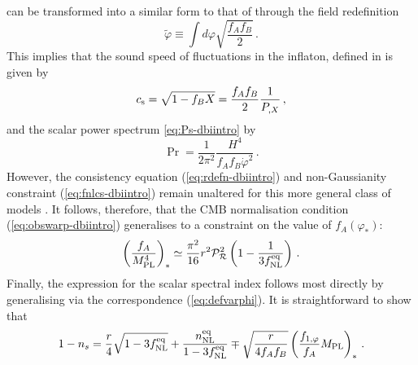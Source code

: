 can be transformed into a similar form to that of 
 through the field redefinition 
% 
\begin{equation}
\label{eq:defvarphi}
\tilde{\varphi} \equiv \int d \varphi \sqrt{\frac{f_Af_B}{2}}  \,.
\end{equation}
% 
This implies that the sound speed of fluctuations in 
the inflaton, defined in  is given by
%  
\begin{equation}
\label{eq:cs-dbi}
c_\mathrm{s} = \sqrt{1-f_B X} = \frac{f_Af_B}{2} \frac{1}{P_{,X}}  \,,
\end{equation}
% 
and the scalar power spectrum \eqref{eq:Ps-dbiintro} by
% 
\begin{equation}
\label{eq:spectrum-dbi}
\Pr = \frac{1}{2\pi^2}\frac{H^4}{f_Af_B\dot{\varphi}^2}  \,.
\end{equation}
% 
However, the consistency equation (\ref{eq:rdefn-dbiintro}) and 
non-Gaussianity constraint (\ref{eq:fnlcs-dbiintro}) remain unaltered 
for this more general class 
of models \cite{lidser2}. It 
follows, therefore, 
that the CMB normalisation condition (\ref{eq:obswarp-dbiintro}) 
generalises to a constraint on the value of $f_A (\varphi_*)$:
%   
\begin{equation}
\label{eq:observef1}
\left( \frac{f_A}{M_{\mathrm{PL}}^4} \right)_{*} \simeq \frac{\pi^2}{16} r^2\mathcal{P}_{\mathcal{R}}^2 
\left( 1- \frac{1}{3f_{\mathrm{NL}}^{\mathrm{eq}}} \right)  \,.
\end{equation}
% 
Finally, the expression for the scalar spectral index
follows most directly by generalising  
via the correspondence (\ref{eq:defvarphi}). It  
is straightforward to show that
%  
\begin{equation}
\label{eq:nsconstraintW}
1-n_s = \frac{r}{4} \sqrt{1-3f_{\mathrm{NL}}^{\mathrm{eq}}}
 +\frac{n_{\mathrm{NL}}^{\mathrm{eq}}}{1-3f_{\mathrm{NL}}^{\mathrm{eq}}} \mp \sqrt{\frac{r}{4f_Af_B}} \left( 
\frac{f_{1,\varphi}}{f_A} M_{\mathrm{PL}} \right)_*  \,.
\end{equation}
% 


